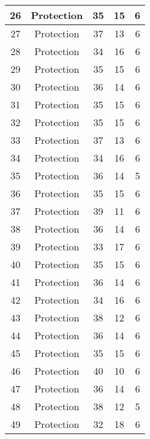 \documentclass[results.tex]{subfiles}
\begin{document}
\begin{center}
\begin{tabular}{| c || c | c | c | c |}
    \hline
    26 & Protection & 35 & 15 & 6 \\ 
    \hline
    27 & Protection & 37 & 13 & 6 \\ 
    \hline
    28 & Protection & 34 & 16 & 6 \\ 
    \hline
    29 & Protection & 35 & 15 & 6 \\ 
    \hline
    30 & Protection & 36 & 14 & 6 \\ 
    \hline
    31 & Protection & 35 & 15 & 6 \\ 
    \hline
    32 & Protection & 35 & 15 & 6 \\ 
    \hline
    33 & Protection & 37 & 13 & 6 \\ 
    \hline
    34 & Protection & 34 & 16 & 6 \\ 
    \hline
    35 & Protection & 36 & 14 & 5 \\ 
    \hline
    36 & Protection & 35 & 15 & 6 \\ 
    \hline
    37 & Protection & 39 & 11 & 6 \\ 
    \hline
    38 & Protection & 36 & 14 & 6 \\ 
    \hline
    39 & Protection & 33 & 17 & 6 \\ 
    \hline
    40 & Protection & 35 & 15 & 6 \\ 
    \hline
    41 & Protection & 36 & 14 & 6 \\ 
    \hline
    42 & Protection & 34 & 16 & 6 \\ 
    \hline
    43 & Protection & 38 & 12 & 6 \\ 
    \hline
    44 & Protection & 36 & 14 & 6 \\ 
    \hline
    45 & Protection & 35 & 15 & 6 \\ 
    \hline
    46 & Protection & 40 & 10 & 6 \\ 
    \hline
    47 & Protection & 36 & 14 & 6 \\ 
    \hline
    48 & Protection & 38 & 12 & 5 \\ 
    \hline
    49 & Protection & 32 & 18 & 6 \\ 
    \hline   \end{tabular}
\end{center}
\end{document}
